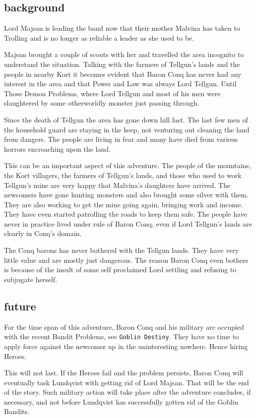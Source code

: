 \subsection*{background}
Lord Majsan is leading the band now that their mother Malvina has taken to Trolling and is no longer as reliable a leader as she used to be.

Majsan brought a couple of scouts with her and travelled the area incognito to understand the situation. Talking with the farmers of Tellgun's lands and the people in nearby Kort it becomes evident that Baron Conq has never had any interest in the area and that Power and Law was always Lord Tellgun. Until Those Demon Problems, where Lord Tellgun and most of his men were slaughtered by some otherworldly monster just passing through.

Since the death of Tellgun the area has gone down hill fast. The last few men of the household guard are staying in the keep, not venturing out cleaning the land from dangers. The people are living in fear and many have died from various horrors encroaching upon the land.

This can be an important aspect of this adventure. The people of the mountains, the Kort villagers, the farmers of Tellgun's lands, and those who used to work Tellgun's mine are very happy that Malvina's daughters have arrived. The newcomers have gone hunting monsters and also brought some silver with them. They are also working to get the mine going again, bringing work and income. They have even started patrolling the roads to keep them safe. The people have never in practice lived under rule of Baron Conq, even if Lord Tellgun's lands are clearly in Conq's domain.

The Conq barons has never bothered with the Tellgun lands. They have very little value and are mostly just dangerous. The reason Baron Conq even bothers is because of the insult of some self proclaimed Lord settling and refusing to subjugate herself.


\subsection*{future}
For the time span of this adventure, Baron Conq and his military are occupied with the recent Bandit Problems, see \texttt{Goblin Destiny}. They have no time to apply force against the newcomer up in the uninteresting nowhere. Hence hiring Heroes.

This will not last. If the Heroes fail and the problem persists, Baron Conq will eventually task Lundqvist with getting rid of Lord Majsan. That will be the end of the story. Such military action will take place after the adventure concludes, if necessary, and not before Lundqvist has successfully gotten rid of the Goblin Bandits.


